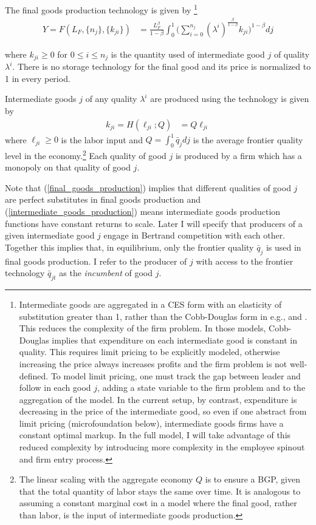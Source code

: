 \documentclass[11pt,english]{article}
\theoremstyle{remark}
\begin{document}
The final goods production technology is given by \footnote{Intermediate goods are aggregated in a CES form with an elasticity of substitution greater than 1, rather than the Cobb-Douglas form in e.g., \cite{grossman_quality_1991} and \cite{baslandze_spinout_2019}. This reduces the complexity of the firm problem. In those models, Cobb-Douglas implies that expenditure on each intermediate good is constant in quality. This requires limit pricing to be explicitly modeled, otherwise increasing the price always increases profits and the firm problem is not well-defined. To model limit pricing, one must track the gap between leader and follow in each good $j$, adding a state variable to the firm problem and to the aggregation of the model. In the current setup, by contrast, expenditure is decreasing in the price of the intermediate good, so even if one abstract from limit pricing (microfoundation below), intermediate goods firms have a constant optimal markup. In the full model, I will take advantage of this reduced complexity by introducing more complexity in the employee spinout and firm entry process.}
\begin{align}
Y = F(L_F,\{n_j\},\{k_{ji}\}) &= \frac{L_F^{\beta}}{1-\beta} \int_0^1 \Big(\sum_{i = 0}^{n_{j}} (\lambda^{i})^{\frac{\beta}{1-\beta}} k_{ji} \Big)^{1-\beta} dj \label{final_goods_production}
\end{align}

where $k_{ji} \ge 0$ for $0 \le i \le n_j$ is the quantity used of intermediate good $j$ of quality $\lambda^i$. There is no storage technology for the final good and its price is normalized to 1 in every period. 

Intermediate goods $j$ of any quality $\lambda^i$ are produced using the technology is given by
\begin{align}
k_{ji} = H(\ell_{ji};Q) &= Q \ell_{ji} \label{intermediate_goods_production}
\end{align}
where $\ell_{ji} \ge 0$ is the labor input and $Q = \int_0^1 \bar{q}_{j} dj$ is the average frontier quality level in the economy.\footnote{The linear scaling with the aggregate economy $Q$ is to ensure a BGP, given that the total quantity of labor stays the same over time. It is analogous to assuming a constant marginal cost in a model where the final good, rather than labor, is the input of intermediate goods production.} Each quality of good $j$ is produced by a firm which has a monopoly on that quality of good $j$. 

Note that (\ref{final_goods_production}) implies that different qualities of good $j$ are perfect substitutes in final goods production and (\ref{intermediate_goods_production}) means intermediate goods production functions have constant returns to scale. Later I will specify that producers of a given intermediate good $j$ engage in Bertrand competition with each other. Together this implies that, in equilibrium, only the frontier quality $\bar{q}_{j}$ is used in final goods production. I refer to the producer of $j$ with access to the frontier technology $\bar{q}_{jt}$ as the \textit{incumbent} of good $j$. 
\end{document}

